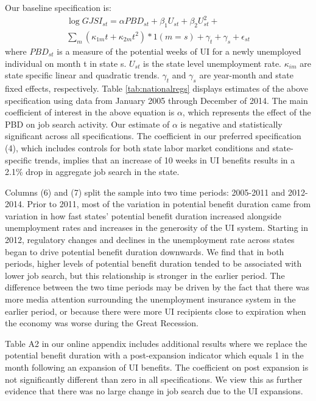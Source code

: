 \documentclass[12pt]{article}
\begin{document}
\begin{spacing}{2}
Our baseline specification is:
\begin{equation}\label{eqn:main}
\begin{split}
\log{GJSI_{st}} = \alpha PBD_{st} + \beta_{1} U_{st} + \beta_{2} U^{2}_{st} + \\
\sum_{m}{(\kappa_{1m}t + \kappa_{2m}t^{2})*1(m=s)} + \gamma_{t} + \gamma_{s} + \epsilon_{st}
\end{split}
\end{equation}
where $PBD_{st}$ is a measure of the potential weeks of UI for a newly unemployed individual on month t in state s. $U_{st}$ is the state level unemployment rate. $\kappa_{im}$ are state specific linear and quadratic trends. $\gamma_{t}$ and $\gamma_{s}$ are year-month and state fixed effects, respectively.
Table \ref{tab:nationalregs} displays estimates of the above specification using data from January 2005 through December of 2014. The main coefficient of interest in the above equation is $\alpha$, which represents the effect of the PBD on job search activity. Our estimate of $\alpha$ is negative and statistically significant across all specifications. The coefficient in our preferred specification (4), which includes controls for both state labor market conditions and state-specific trends, implies that an increase of 10 weeks in UI benefits results in a 2.1\% drop in aggregate job search in the state.

Columns (6) and (7) split the sample into two time periods: 2005-2011 and 2012-2014. Prior to 2011, most of the variation in potential benefit duration came from variation in how fast states' potential benefit duration increased alongside unemployment rates and increases in the generosity of the UI system. Starting in 2012, regulatory changes and declines in the unemployment rate across states began to drive potential benefit duration downwards. We find that in both periods, higher levels of potential benefit duration tended to be associated with lower job search, but this relationship is stronger in the earlier period. The difference between the two time periods may be driven by the fact that there was more media attention surrounding the unemployment insurance system in the earlier period, or because there were more UI recipients close to expiration when the economy was worse during the Great Recession.

Table A2 in our online appendix includes additional results where we replace the potential benefit duration with a post-expansion indicator which equals 1 in the month following an expansion of UI benefits. The coefficient on post expansion is not significantly different than zero in all specifications. We view this as further evidence that there was no large change in job search due to the UI expansions.


\end{spacing}
\end{document}
